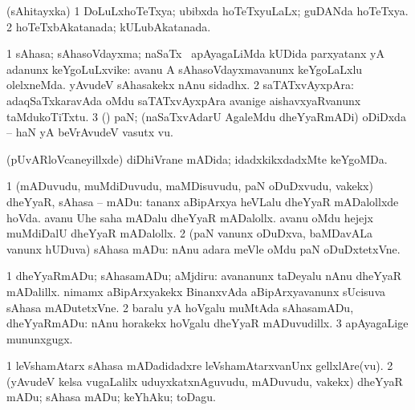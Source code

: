 {\bentry
{} 
\gl{\gu}
\expl{}
\bmng
 (sAhitayxka) 
\bnum
\num{1} DoLuLxhoTeTxya; ubibxda hoTeTxyuLaLx; guDANda hoTeTxya. 
\num{2} hoTeTxbAkatanada; kULubAkatanada. 
\enum
\emng
\eentry

\bentry
{} 
\gl{\nA}
\expl{}
\bmng
\bnum
\num{1} sAhasa; sAhasoVdayxma; naSaTx \mo\ apAyagaLiMda kUDida parxyatanx yA adanunx keYgoLuLxvike:  avanu A sAhasoVdayxmavanunx keYgoLaLxlu olelxneMda.  yAvudeV sAhasakekx nAnu sidadhx. 
\num{2} saTATxvAyxpAra:  adaqSaTxkaravAda oMdu saTATxvAyxpAra avanige aishavxyaRvanunx taMdukoTiTxtu. 
\num{3} (\pArxparx) paN; (naSaTxvAdarU AgaleMdu dheYyaRmADi) oDiDxda -- haN yA beVrAvudeV vasutx \mo vu. 
\enum
\emng

\noindent 
\gl{\pagu}
\expl{}
\bmng
  (pUvARloVcaneyillxde) diDhiVrane mADida; idadxkikxdadxMte keYgoMDa. 
\emng
\eentry

\bentry
{} 
\gl{\sakirx}
\expl{}
\bmng
\bnum
\num{1} (mADuvudu, muMdiDuvudu, maMDisuvudu, paN oDuDxvudu, \mo vakekx) dheYyaR, sAhasa -- mADu:  tananx aBipArxya heVLalu dheYyaR mADalollxde hoVda.  avanu Uhe saha mADalu dheYyaR mADalollx.  avanu oMdu hejejx muMdiDalU dheYyaR mADalollx. 
\num{2} (paN \mo vanunx oDuDxva, baMDavALa \mo vanunx hUDuva) sAhasa mADu:  nAnu adara meVle oMdu paN oDuDxtetxVne. 
\enum
\emng

\noindent
\gl{\akirx}
\expl{}
\bmng
\bnum
\num{1} dheYyaRmADu; sAhasamADu; aMjdiru:  avananunx taDeyalu nAnu dheYyaR mADalillx.  nimamx aBipArxyakekx BinanxvAda aBipArxyavanunx sUcisuva sAhasa mADutetxVne. 
\num{2} baralu yA hoVgalu muMtAda sAhasamADu, dheYyaRmADu:  nAnu horakekx hoVgalu dheYyaR mADuvudillx. 
\num{3} apAyagaLige mununxgugx. 
\enum
\emng

\noindent 
\gl{\pagu}
\expl{}
\bmng
\bnum
\num{1}  leVshamAtarx sAhasa mADadidadxre leVshamAtarxvanUnx gellxlAre(vu). 
\num{2}  (yAvudeV kelsa \mo vugaLalilx uduyxkatxnAguvudu, mADuvudu, \mo vakekx) dheYyaR mADu; sAhasa mADu; keYhAku; toDagu. 
\enum
\emng
\eentry

}
